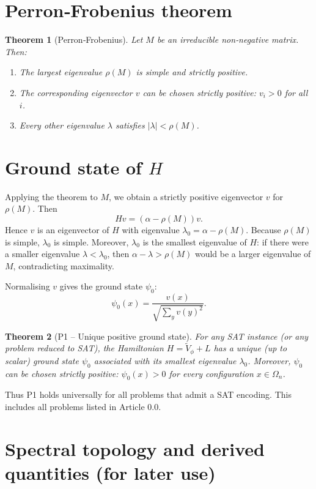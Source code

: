 \documentclass[11pt,a4paper]{article}
\newtheorem{theorem}{Theorem}[section]
\begin{document}
\section{Perron‑Frobenius theorem}

\begin{theorem}[Perron‑Frobenius]
Let \(M\) be an irreducible non‑negative matrix. Then:
\begin{enumerate}
\item The largest eigenvalue \(\rho(M)\) is simple and strictly positive.
\item The corresponding eigenvector \(v\) can be chosen strictly positive: \(v_i > 0\) for all \(i\).
\item Every other eigenvalue \(\lambda\) satisfies \(|\lambda| < \rho(M)\).
\end{enumerate}
\end{theorem}

\section{Ground state of \(H\)}

Applying the theorem to \(M\), we obtain a strictly positive eigenvector \(v\) for \(\rho(M)\). Then
\[
H v = (\alpha - \rho(M)) v.
\]
Hence \(v\) is an eigenvector of \(H\) with eigenvalue \(\lambda_0 = \alpha - \rho(M)\). Because \(\rho(M)\) is simple, \(\lambda_0\) is simple. Moreover, \(\lambda_0\) is the smallest eigenvalue of \(H\): if there were a smaller eigenvalue \(\lambda < \lambda_0\), then \(\alpha - \lambda > \rho(M)\) would be a larger eigenvalue of \(M\), contradicting maximality.

Normalising \(v\) gives the ground state \(\psi_0\):
\[
\psi_0(x) = \frac{v(x)}{\sqrt{\sum_{y} v(y)^2}}.
\]

\begin{theorem}[P1 – Unique positive ground state]
For any SAT instance (or any problem reduced to SAT), the Hamiltonian \(H = \tilde{V}_{\phi} + L\) has a unique (up to scalar) ground state \(\psi_0\) associated with its smallest eigenvalue \(\lambda_0\). Moreover, \(\psi_0\) can be chosen strictly positive: \(\psi_0(x) > 0\) for every configuration \(x\in\Omega_n\).
\end{theorem}

Thus P1 holds universally for all problems that admit a SAT encoding. This includes all problems listed in Article 0.0.

\section{Spectral topology and derived quantities (for later use)}
\end{document}
